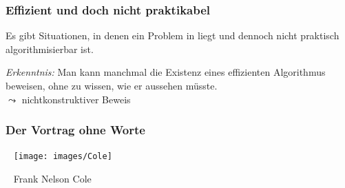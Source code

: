 \documentclass[aspectratio=1610,onlymath]{beamer}
\begin{document}
\begin{frame}\frametitle{Effizient und doch nicht praktikabel}

Es gibt Situationen, in denen ein Problem in  liegt 
und dennoch nicht praktisch algorithmisierbar ist.\medskip

\bigskip\pause

\pause

\emph{Erkenntnis:} Man kann manchmal die Existenz eines effizienten Algorithmus beweisen,
ohne zu wissen, wie er aussehen müsste.\\
$\leadsto$ \alert{nichtkonstruktiver Beweis}


\end{frame}


\begin{frame}\frametitle{Der Vortrag ohne Worte}

~\hfill
\texttt{[image: images/Cole]}
\hfill~

~\hfill
Frank Nelson Cole
\hfill~



\end{frame}
\end{document}
